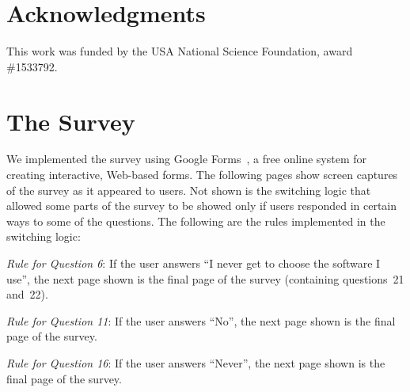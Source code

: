 \documentclass{casicswhitepaper}
\begin{document}
\section{Acknowledgments}

This work was funded by the USA National Science Foundation, award \#1533792.



\appendix
\section{The Survey}
\label{apdx:survey}

We implemented the survey using Google Forms~\cite{googleforms}, a free online system for creating interactive, Web-based forms.  The following pages show screen captures of the survey as it appeared to users.  Not shown is the switching logic that allowed some parts of the survey to be showed only if users responded in certain ways to some of the questions.  The following are the rules implemented in the switching logic:
\begin{description}

\item \emph{Rule for Question 6}: If the user answers ``I never get to choose the software I use'', the next page shown is the final page of the survey (containing questions~21 and~22).

\item  \emph{Rule for Question 11}: If the user answers ``No'', the next page shown is the final page of the survey.

\item \emph{Rule for Question 16}:  If the user answers ``Never'', the next page shown is the final page of the survey.

\end{description}


\clearpage




\clearpage


\end{document}
